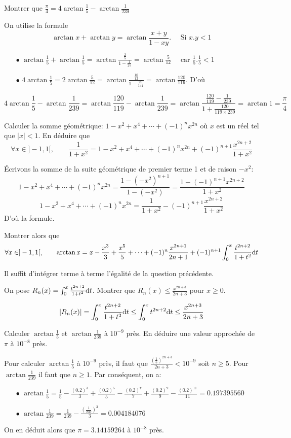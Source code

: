 \documentclass{article}[11pt]
\def \de {{\rm d}}
\begin{document}
\begin{enumerate}
{\color{blue}
\item Montrer que $\frac{\pi}{4}=4\arctan\frac 15-\arctan\frac{1}{239}$
}

On utilise la formule
\[\arctan x +\arctan y =\arctan\frac{x+y}{1-xy}.\quad \mbox{ Si } x.y < 1\]
\begin{itemize}
\item[$\bullet$] $\displaystyle \arctan \frac 15 +\arctan \frac 15=\arctan\frac{\frac 25}{1-\frac{1}{25}}=\arctan\frac{5}{12}\quad \mbox{ car } \frac 15.\frac 15 < 1$
\item[$\bullet$] $\displaystyle 4\arctan\frac 15=2\arctan\frac{5}{12}=\arctan\frac{\frac{10}{12}}{1-\frac{25}{144}}=\arctan\frac{120}{119}$. D'où
\end{itemize}
\[4\arctan\frac 15-\arctan\frac{1}{239}=\arctan\frac{120}{119}-\arctan\frac{1}{239}=\arctan\frac{\frac{120}{119}-\frac{1}{239}}{1+\frac{120}{119\times 239}}=\arctan 1=\frac{\pi}{4}\]
{\color{blue}
\item Calculer la somme géométrique: $1-x^2+x^4+\cdots +(-1)^nx^{2n}$ où $x$  est un réel tel que $|x|<1$. En déduire que
\[\forall x\in ]-1,1[,\qquad \frac{1}{1+x^2}=1-x^2+x^4+\cdots +(-1)^nx^{2n}+(-1)^{n+1}\frac{x^{2n+2}}{1+x^2}\]
}
Écrivons la somme de la suite géométrique de premier terme 1 et de raison $-x^2$:
\[1-x^2+x^4+\cdots +(-1)^nx^{2n}=\frac{1-(-x^2)^{n+1}}{1-(-x^2)}=\frac{1-(-1)^{n+1}x^{2n+2}}{1+x^2} \]
\[1-x^2+x^4+\cdots +(-1)^nx^{2n}=\frac{1}{1+x^2}-(-1)^{n+1}\frac{x^{2n+2}}{1+x^2} \]
D'où la formule.
{\color{blue}
\item Montrer alors que
\[\forall x\in ]-1,1[,\qquad \arctan x=x-\frac{x^3}3+\frac{x^5}5+\cdots +(-1)^n\frac{x^{2n+1}}{2n+1}+(-1)^{n+1}\int_0^x\frac{t^{2n+2}}{1+t^2}\de t\]
}
Il suffit d'intégrer terme à terme l'égalité de la question précédente.
{\color{blue}
\item On pose $R_n(x)=\int_0^x\frac{t^{2n+2}}{1+t^2}\de t$. Montrer que $R_n(x)\leq\frac{x^{2n+3}}{2n+3}$ pour $x\geq 0$.}
\[|R_n(x)|=\int_0^x\frac{t^{2n+2}}{1+t^2}\de t\leq \int_0^xt^{2n+2}\de t\leq \frac{x^{2n+3}}{2n+3}\]

{\color{blue}
\item Calculer $\arctan\frac 15$ et $\arctan\frac{1}{239}$ à $10^{-9}$ près. En déduire une valeur approchée de $\pi$ à $10^{-8}$ près. 
}
Pour calculer $\arctan\frac 15$ à $10^{-9}$ près, il faut que $\frac{\left(\frac 15\right)^{2n+3}}{2n+3}<10^{-9}$ soit $n\geq 5$. Pour $\arctan\frac{1}{239}$ il faut que $n\geq 1$. Par conséquent, on a:
\begin{itemize}
\item[$\bullet$] $\displaystyle \arctan\frac 15=\frac 15 -\frac{(0.2)^3}{3}+\frac{(0.2)^5}{5}-\frac{(0.2)^7}{7}+\frac{(0.2)^9}{9}-\frac{(0.2)^{11}}{11}=0.197395560$
\item[$\bullet$] $\displaystyle \arctan\frac 1{239}=\frac 1{239}-\frac{\left(\frac 1{239}\right)^3}{3}=0.004184076$
\end{itemize}
On en déduit alors que $\pi=3.14159264$ à $10^{-8}$ près.
\end{enumerate}
\end{document}
